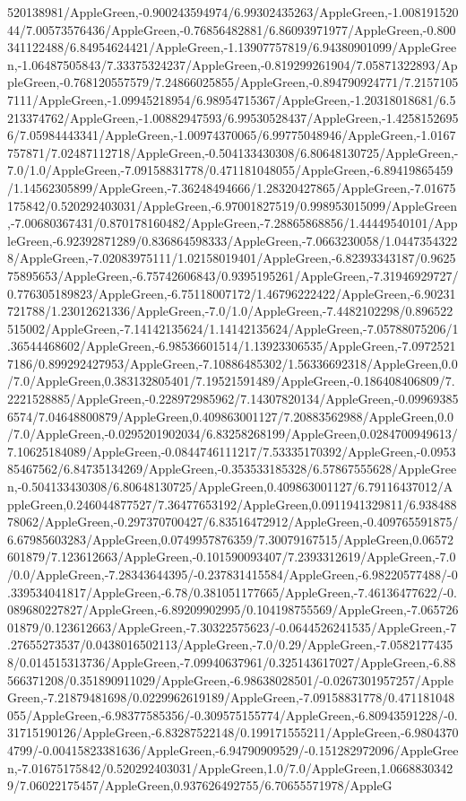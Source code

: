 {\begin{tikzternal}
520138981/AppleGreen,-0.900243594974/6.99302435263/AppleGreen,-1.00819152044/7.00573576436/AppleGreen,-0.76856482881/6.86093971977/AppleGreen,-0.800341122488/6.84954624421/AppleGreen,-1.13907757819/6.94380901099/AppleGreen,-1.06487505843/7.33375324237/AppleGreen,-0.819299261904/7.05871322893/AppleGreen,-0.768120557579/7.24866025855/AppleGreen,-0.894790924771/7.21571057111/AppleGreen,-1.09945218954/6.98954715367/AppleGreen,-1.20318018681/6.5213374762/AppleGreen,-1.00882947593/6.99530528437/AppleGreen,-1.42581526956/7.05984443341/AppleGreen,-1.00974370065/6.99775048946/AppleGreen,-1.0167757871/7.02487112718/AppleGreen,-0.504133430308/6.80648130725/AppleGreen,-7.0/1.0/AppleGreen,-7.09158831778/0.471181048055/AppleGreen,-6.89419865459/1.14562305899/AppleGreen,-7.36248494666/1.28320427865/AppleGreen,-7.01675175842/0.520292403031/AppleGreen,-6.97001827519/0.998953015099/AppleGreen,-7.00680367431/0.870178160482/AppleGreen,-7.28865868856/1.44449540101/AppleGreen,-6.92392871289/0.836864598333/AppleGreen,-7.0663230058/1.04473543228/AppleGreen,-7.02083975111/1.02158019401/AppleGreen,-6.82393343187/0.962575895653/AppleGreen,-6.75742606843/0.9395195261/AppleGreen,-7.31946929727/0.776305189823/AppleGreen,-6.75118007172/1.46796222422/AppleGreen,-6.90231721788/1.23012621336/AppleGreen,-7.0/1.0/AppleGreen,-7.4482102298/0.896522515002/AppleGreen,-7.14142135624/1.14142135624/AppleGreen,-7.05788075206/1.36544468602/AppleGreen,-6.98536601514/1.13923306535/AppleGreen,-7.09725217186/0.899292427953/AppleGreen,-7.10886485302/1.56336692318/AppleGreen,0.0/7.0/AppleGreen,0.383132805401/7.19521591489/AppleGreen,-0.186408406809/7.2221528885/AppleGreen,-0.228972985962/7.14307820134/AppleGreen,-0.099693856574/7.04648800879/AppleGreen,0.409863001127/7.20883562988/AppleGreen,0.0/7.0/AppleGreen,-0.0295201902034/6.83258268199/AppleGreen,0.0284700949613/7.10625184089/AppleGreen,-0.0844746111217/7.53335170392/AppleGreen,-0.095385467562/6.84735134269/AppleGreen,-0.353533185328/6.57867555628/AppleGreen,-0.504133430308/6.80648130725/AppleGreen,0.409863001127/6.79116437012/AppleGreen,0.246044877527/7.36477653192/AppleGreen,0.0911941329811/6.93848878062/AppleGreen,-0.297370700427/6.83516472912/AppleGreen,-0.409765591875/6.67985603283/AppleGreen,0.0749957876359/7.30079167515/AppleGreen,0.06572601879/7.123612663/AppleGreen,-0.101590093407/7.2393312619/AppleGreen,-7.0/0.0/AppleGreen,-7.28343644395/-0.237831415584/AppleGreen,-6.98220577488/-0.339534041817/AppleGreen,-6.78/0.381051177665/AppleGreen,-7.46136477622/-0.089680227827/AppleGreen,-6.89209902995/0.104198755569/AppleGreen,-7.06572601879/0.123612663/AppleGreen,-7.30322575623/-0.0644526241535/AppleGreen,-7.27655273537/0.0438016502113/AppleGreen,-7.0/0.29/AppleGreen,-7.05821774358/0.014515313736/AppleGreen,-7.09940637961/0.325143617027/AppleGreen,-6.88566371208/0.351890911029/AppleGreen,-6.98638028501/-0.0267301957257/AppleGreen,-7.21879481698/0.0229962619189/AppleGreen,-7.09158831778/0.471181048055/AppleGreen,-6.98377585356/-0.309575155774/AppleGreen,-6.80943591228/-0.31715190126/AppleGreen,-6.83287522148/0.199171555211/AppleGreen,-6.98043704799/-0.00415823381636/AppleGreen,-6.94790909529/-0.151282972096/AppleGreen,-7.01675175842/0.520292403031/AppleGreen,1.0/7.0/AppleGreen,1.06688303429/7.06022175457/AppleGreen,0.937626492755/6.70655571978/AppleG
\end{tikzternal}}
